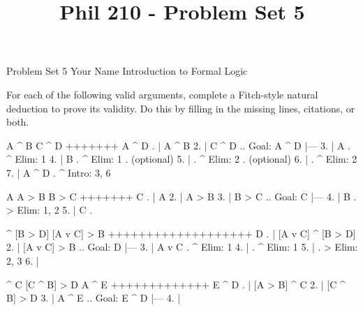 
\title{Phil 210 - Problem Set 5}

\heading
Problem Set 5
Your Name
Introduction to Formal Logic
\endheading

For each of the following valid arguments, complete a Fitch-style natural deduction to prove its validity. Do this by filling in the missing lines, citations, or both.

\problems
{}
\argument
 A ^ B
 C ^ D
+++++++
 A ^ D
\endargument
        \answer
        . | A ^ B
         2. | C ^ D  ..  Goal: A ^ D
            |---
         3. | A      .  ^ Elim:  1
         4. | B      .  ^ Elim:  1  .  (optional)
         5. |        .  ^ Elim:  2  .  (optional)
         6. |        .  ^ Elim:  2
         7. | A ^ D  .  ^ Intro: 3, 6
        \endfitchproof
        \endanswer

\argument
 A
 A > B
 B > C
+++++++
 C
\endargument
        \answer
        . | A
         2. | A > B
         3. | B > C  ..  Goal: C
            |---
         4. | B      .  > Elim: 1, 2
         5. | C      .  
        \endfitchproof
        \endanswer

\argument
 [A v C] ^ [B > D]
 [A v C] > B
+++++++++++++++++++
 D
\endargument
        \answer
        . | [A v C] ^ [B > D]
         2. | [A v C] > B        ..  Goal: D
            |---
         3. | A v C              .  ^ Elim: 1
         4. |                    .  ^ Elim: 1
         5. |                    .  > Elim: 2, 3
         6. | 
        \endfitchproof
        \endanswer

\argument
 [A > B] ^ C
 [C ^ B] > D
 A ^ E
+++++++++++++
 E ^ D
\endargument
        \answer
        . | [A > B] ^ C
         2. | [C ^ B] > D
         3. | A ^ E        ..  Goal: E ^ D
            |---
         4. | 
        \endfitchproof
        \endanswer

\endproblems
\bye
